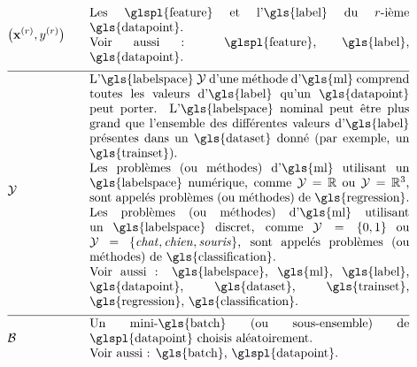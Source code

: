 \begin{align}
	& \big(\featurevec^{(\sampleidx)},\truelabel^{(\sampleidx)}\big) & \quad & \parbox{.75\textwidth}{Les \glspl{feature} et l'\gls{label} du $\sampleidx$-ième \gls{datapoint}. \\ Voir aussi : \glspl{feature}, \gls{label}, \gls{datapoint}.} \nonumber \\[2mm] \hline \nonumber\\[-5mm]
	& \labelspace & \quad & \parbox{.75\textwidth}{
	L’\gls{labelspace} $\labelspace$ d’une méthode d’\gls{ml} comprend toutes les valeurs d'\gls{label} qu’un \gls{datapoint} peut porter. L’\gls{labelspace} nominal peut être plus grand que l’ensemble des différentes valeurs d'\gls{label} présentes dans un \gls{dataset} donné (par exemple, un \gls{trainset}). \\
	Les problèmes (ou méthodes) d'\gls{ml} utilisant un \gls{labelspace} numérique, comme $\labelspace=\mathbb{R}$ ou $\labelspace=\mathbb{R}^{3}$, sont appelés problèmes (ou méthodes) de \gls{regression}. \\
	Les problèmes (ou méthodes) d'\gls{ml} utilisant un \gls{labelspace} discret, comme $\labelspace=\{0,1\}$ ou $\labelspace=\{\mbox{\emph{chat}},\mbox{\emph{chien}},\mbox{\emph{souris}}\}$, sont appelés problèmes (ou méthodes) de \gls{classification}. \\ 
	Voir aussi : \gls{labelspace}, \gls{ml}, \gls{label}, \gls{datapoint},  \gls{dataset}, \gls{trainset}, 
	\gls{regression}, \gls{classification}.} \nonumber \\[2mm] \hline \nonumber\\[-5mm]
	& \batch & \quad & \parbox{.75\textwidth}{Un mini-\gls{batch} (ou sous-ensemble) de \glspl{datapoint} choisis aléatoirement. \\ Voir aussi : \gls{batch}, \glspl{datapoint}.} \nonumber
\end{align}


